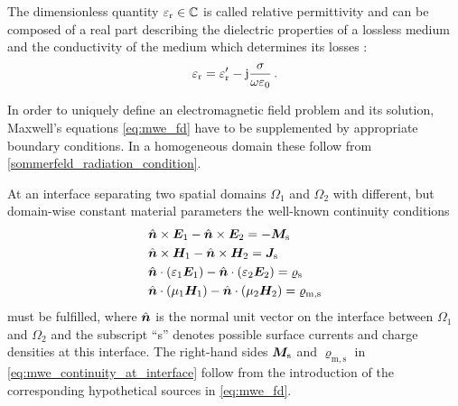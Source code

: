 The dimensionless quantity $\varepsilon_{\mathrm{r}} \in \mathbb{C}$ is called relative permittivity 
and can be composed of a real part describing the dielectric properties of a
lossless medium and the conductivity of the medium which determines its losses
\cite[p.~43]{Jin2015}:
\begin{equation}
	\varepsilon_{\mathrm{r}} = \varepsilon_{\mathrm{r}}^\prime - \mathrm{j} \frac{\sigma}{\omega \varepsilon_0} \,.
\end{equation}

In order to uniquely define an electromagnetic field problem and its solution,
Maxwell's equations \eqref{eq:mwe_fd} have to be supplemented by appropriate
boundary conditions.
In a homogeneous domain these follow from
\cref{sommerfeld_radiation_condition}.

At an interface separating two spatial domains $\Omega_1$ and $\Omega_2$ with
different, but domain-wise constant material parameters the well-known
continuity conditions \cite[pp.~20]{Jackson2013}
\begin{subequations}\label{eq:mwe_continuity_at_interface}
	\begin{align}
		&\uv{n} \times \pvec{E}_1 - \uv{n} \times \pvec{E}_2 =
		- \pvec{M}_\mathrm{s} \\
		&\uv{n} \times \pvec{H}_1 - \uv{n} \times \pvec{H}_2 =
		\pvec{J}_\mathrm{s} \\
		&\uv{n} \cdot \left(\varepsilon_1 \pvec{E}_1\right) -
		\uv{n} \cdot \left(\varepsilon_2 \pvec{E}_2\right) = 
		\varrho_\mathrm{s} \\
		&\uv{n} \cdot \left(\mu_1 \pvec{H}_1\right) -
		\uv{n} \cdot \left(\mu_2 \pvec{H}_2\right) = 
		\varrho_\mathrm{m,s} \\
	\end{align}
\end{subequations}
must be fulfilled, where $\uv{n}$ is the normal unit vector on the interface
between $\Omega_1$ and $\Omega_2$ and the subscript \enquote{s} denotes
possible surface currents and charge densities at this interface.
The right-hand sides $\pvec{M}_\mathrm{s}$ and $\varrho_\mathrm{m,s}$
in \eqref{eq:mwe_continuity_at_interface} follow from the introduction of
the corresponding hypothetical sources in \eqref{eq:mwe_fd}.

